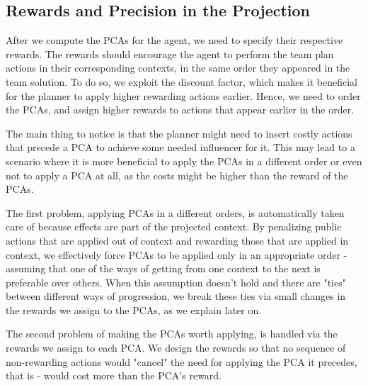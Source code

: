 {\subsection{Rewards and Precision in the Projection}

After we compute the PCAs for the agent, we need to specify their respective rewards. The rewards should encourage the agent to perform the team plan actions in their corresponding contexts, in the same order they appeared in the team solution. 
To do so, we exploit the discount factor, which makes it beneficial for the planner to apply higher rewarding actions earlier. Hence, we need to order the PCAs, and assign higher rewards to actions that appear earlier in the order.

The main thing to notice is that the planner might need to insert costly actions that precede a PCA to achieve some needed influencer for it. This may lead to a scenario where it is more beneficial to apply the PCAs in a different order or even not to apply a PCA at all, as the costs might be higher than the reward of the PCAs.

The first problem, applying PCAs in a different orders, is automatically taken care of because effects are part of the
projected context. 
By penalizing public actions that are applied out of context and rewarding those that are applied in context, we effectively force PCAs to be applied only in an appropriate order - assuming that one of the ways of getting from one context to the next is preferable over others. When this assumption doesn't hold and there are "ties" between different ways of progression, we break these ties via small changes in the rewards we assign to the PCAs, as we explain later on.

The second problem of making the PCAs worth applying, is handled via the rewards we assign to each PCA. 
%
We design the rewards so that no sequence of non-rewarding actions would "cancel" the need for applying the PCA it precedes, that is - would cost more than the PCA's reward.

}
